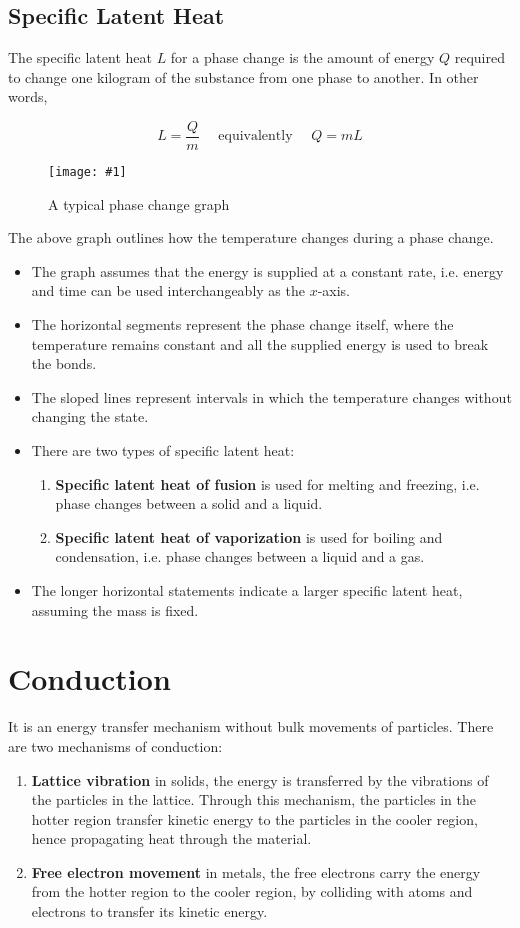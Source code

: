 \documentclass[a4paper,12pt]{article}
\let\oldsection\section
\renewcommand\section{\clearpage\oldsection}
\newcommand{\img}[4]{\begin{center}
  \begin{figure}[H]
    \centering
    \texttt{[image: \#1]}
    \caption{#3}
    \label{fig:#4}
  \end{figure}
\end{center}}
\begin{document}
\subsection{Specific Latent Heat}

The specific latent heat $L$ for a phase change is the amount of energy $Q$ required to change one kilogram of the substance from one phase to another. In other words,

$$L = \dfrac{Q}{m} \quad \text{ equivalently } \quad Q = mL$$

\img{phasechangegraph}{0.65}{A typical phase change graph}{phase_change_graph}

The above graph outlines how the temperature changes during a phase change.
\begin{itemize}
  \item The graph assumes that the energy is supplied at a constant rate, i.e. energy and time can be used interchangeably as the $x$-axis.
  \item The horizontal segments represent the phase change itself, where the temperature remains constant and all the supplied energy is used to break the bonds.
  \item The sloped lines represent intervals in which the temperature changes without changing the state.
  \item There are two types of specific latent heat:
        \begin{enumerate}
          \item \textbf{Specific latent heat of fusion} is used for melting and freezing, i.e. phase changes between a solid and a liquid.
          \item \textbf{Specific latent heat of vaporization} is used for boiling and condensation, i.e. phase changes between a liquid and a gas.
        \end{enumerate}
  \item The longer horizontal statements indicate a larger specific latent heat, assuming the mass is fixed.
\end{itemize}

\section{Conduction}

It is an energy transfer mechanism without bulk movements of particles. There are two mechanisms of conduction:
\begin{enumerate}
  \item \textbf{Lattice vibration} in solids, the energy is transferred by the vibrations of the particles in the lattice. Through this mechanism, the particles in the hotter region transfer kinetic energy to the particles in the cooler region, hence propagating heat through the material.
  \item \textbf{Free electron movement} in metals, the free electrons carry the energy from the hotter region to the cooler region, by colliding with atoms and electrons to transfer its kinetic energy.
\end{enumerate}
\end{document}
